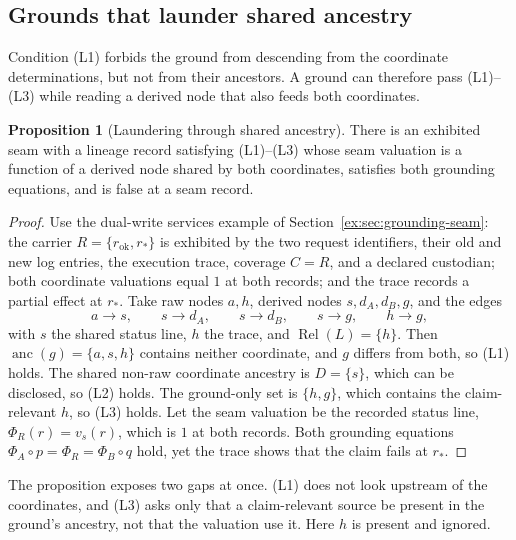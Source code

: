 \documentclass[11pt]{article}
\theoremstyle{definition}
\newtheorem{proposition}{Proposition}[section]
\begin{document}
\subsection{Grounds that launder shared ancestry}\label{ex:sec:laundering}

Condition (L1) forbids the ground from descending from the coordinate determinations, but not from their ancestors. A ground can therefore pass (L1)--(L3) while reading a derived node that also feeds both coordinates.

\begin{proposition}[Laundering through shared ancestry]\label{ex:prop:laundering}
There is an exhibited seam with a lineage record satisfying (L1)--(L3) whose seam valuation is a function of a derived node shared by both coordinates, satisfies both grounding equations, and is false at a seam record.
\end{proposition}
\begin{proof}
Use the dual-write services example of Section~\ref{ex:sec:grounding-seam}: the carrier $R=\{r_{\mathrm{ok}},r_*\}$ is exhibited by the two request identifiers, their old and new log entries, the execution trace, coverage $C=R$, and a declared custodian; both coordinate valuations equal $1$ at both records; and the trace records a partial effect at $r_*$. Take raw nodes $a,h$, derived nodes $s,d_A,d_B,g$, and the edges
\[
a\to s,\qquad s\to d_A,\qquad s\to d_B,\qquad s\to g,\qquad h\to g,
\]
with $s$ the shared status line, $h$ the trace, and $\operatorname{Rel}(L)=\{h\}$. Then $\operatorname{anc}(g)=\{a,s,h\}$ contains neither coordinate, and $g$ differs from both, so (L1) holds. The shared non-raw coordinate ancestry is $D=\{s\}$, which can be disclosed, so (L2) holds. The ground-only set is $\{h,g\}$, which contains the claim-relevant $h$, so (L3) holds. Let the seam valuation be the recorded status line, $\Phi_R(r)=v_s(r)$, which is $1$ at both records. Both grounding equations $\Phi_A\circ p=\Phi_R=\Phi_B\circ q$ hold, yet the trace shows that the claim fails at $r_*$.
\end{proof}

The proposition exposes two gaps at once. (L1) does not look upstream of the coordinates, and (L3) asks only that a claim-relevant source be present in the ground's ancestry, not that the valuation use it. Here $h$ is present and ignored.
\end{document}
